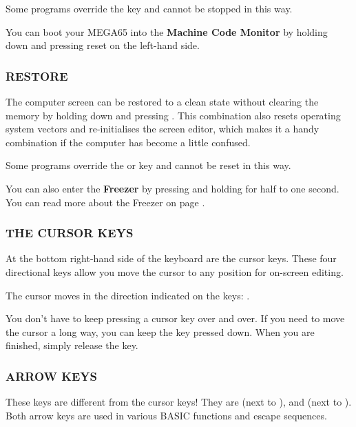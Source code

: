 Some programs override the  key and cannot be stopped in this way.

You can boot your MEGA65 into the {\bf Machine Code Monitor} by holding down  and pressing reset on the left-hand side.

\subsubsection{RESTORE}
The computer screen can be restored to a clean state without clearing the memory by holding down  and pressing . This combination also resets operating system vectors and re-initialises the screen editor, which makes it a handy combination if the computer has become a little confused.

Some programs override the  or  key and cannot be reset in this way.

You can also enter the {\bf Freezer} by pressing and holding  for half to one second. You can
read more about the Freezer on page \pageref{sec:freezer}.

\newpage

\subsubsection{THE CURSOR KEYS}
At the bottom right-hand side of the keyboard are the cursor keys. These four directional keys allow you move the cursor to any position for on-screen editing.

The cursor moves in the direction indicated on the keys: \megakey{$\leftarrow$} \megakey{$\uparrow$} \megakey{$\rightarrow$} \megakey{$\downarrow$}.

You don't have to keep pressing a cursor key over and over. If you need to move the cursor a long way, you can keep the key pressed down. When you are finished, simply release the key.

\subsubsection{ARROW KEYS}
These keys are different from the cursor keys! They are \megakeywhite{$\leftarrow$} (next to ), and \megakeywhite{$\uparrow$} (next to ).
Both arrow keys are used in various BASIC functions and escape sequences.

